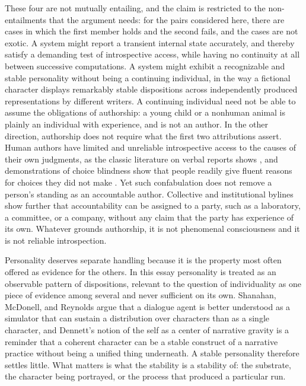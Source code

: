 \documentclass[12pt]{article}
\theoremstyle{definition}
\theoremstyle{plain}
\begin{document}
These four are not mutually entailing, and the claim is restricted to the non-entailments that the argument needs: for the pairs considered here, there are cases in which the first member holds and the second fails, and the cases are not exotic. A system might report a transient internal state accurately, and thereby satisfy a demanding test of introspective access, while having no continuity at all between successive computations. A system might exhibit a recognizable and stable personality without being a continuing individual, in the way a fictional character displays remarkably stable dispositions across independently produced representations by different writers. A continuing individual need not be able to assume the obligations of authorship: a young child or a nonhuman animal is plainly an individual with experience, and is not an author. In the other direction, authorship does not require what the first two attributions assert. Human authors have limited and unreliable introspective access to the causes of their own judgments, as the classic literature on verbal reports shows \cite{nisbett1977}, and demonstrations of choice blindness show that people readily give fluent reasons for choices they did not make \cite{johansson2005}. Yet such confabulation does not remove a person's standing as an accountable author. Collective and institutional bylines show further that accountability can be assigned to a party, such as a laboratory, a committee, or a company, without any claim that the party has experience of its own. Whatever grounds authorship, it is not phenomenal consciousness and it is not reliable introspection.

Personality deserves separate handling because it is the property most often offered as evidence for the others. In this essay personality is treated as an observable pattern of dispositions, relevant to the question of individuality as one piece of evidence among several and never sufficient on its own. Shanahan, McDonell, and Reynolds \cite{shanahan2023} argue that a dialogue agent is better understood as a simulator that can sustain a distribution over characters than as a single character, and Dennett's notion of the self as a center of narrative gravity \cite{dennett1992} is a reminder that a coherent character can be a stable construct of a narrative practice without being a unified thing underneath. A stable personality therefore settles little. What matters is what the stability is a stability of: the substrate, the character being portrayed, or the process that produced a particular run.
\end{document}
